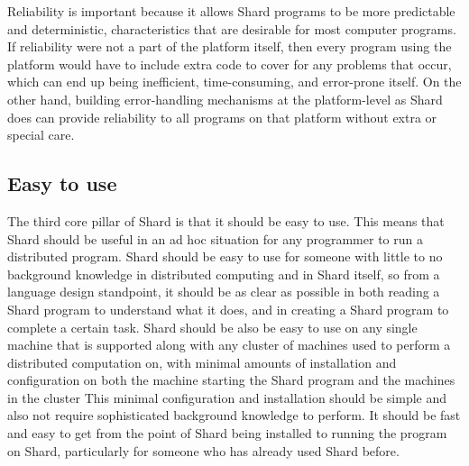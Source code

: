 \documentclass[oneside]{report}
\begin{document}
Reliability is important because it allows Shard programs to be more predictable and deterministic, characteristics that are desirable for most computer programs. If reliability were not a part of the platform itself, then every program using the platform would have to include extra code to cover for any problems that occur, which can end up being inefficient, time-consuming, and error-prone itself. On the other hand, building error-handling mechanisms at the platform-level as Shard does can provide reliability to all programs on that platform without extra or special care.

\subsection{Easy to use}

The third core pillar of Shard is that it should be easy to use.
This means that Shard should be useful in an ad hoc situation for any programmer to run a distributed program.
Shard should be easy to use for someone with little to no background knowledge in distributed computing and in Shard itself, so from a language design standpoint, it should be as clear as possible in both reading a Shard program to understand what it does, and in creating a Shard program to complete a certain task.
Shard should be also be easy to use on any single machine that is supported along with any cluster of machines used to perform a distributed computation on, with minimal amounts of installation and configuration on both the machine starting the Shard program and the machines in the cluster
This minimal configuration and installation should be simple and also not require sophisticated background knowledge to perform.
It should be fast and easy to get from the point of Shard being installed to running the program on Shard, particularly for someone who has already used Shard before.
\end{document}
